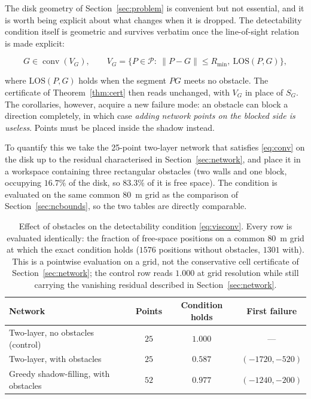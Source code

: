 \documentclass[preprint,12pt,3p]{elsarticle}
\theoremstyle{definition}
\newcommand{\conv}{\operatorname{conv}}
\newcommand{\Rmin}{R_{\min}}
\newcommand{\bP}{\mathcal{P}}
\begin{document}
The disk geometry of Section~\ref{sec:problem} is convenient but not essential, and it is worth
being explicit about what changes when it is dropped. The detectability condition itself is
geometric and survives verbatim once the line-of-sight relation is made explicit:

\begin{equation}
G\in\conv(V_G),\qquad
V_G=\{P\in\bP:\ \|P-G\|\le\Rmin,\ \mathrm{LOS}(P,G)\},
\label{eq:visconv}
\end{equation}

where $\mathrm{LOS}(P,G)$ holds when the segment $PG$ meets no obstacle. The certificate of
Theorem~\ref{thm:cert} then reads unchanged, with $V_G$ in place of $S_G$. The corollaries,
however, acquire a new failure mode: an obstacle can block a direction completely, in which case
\emph{adding network points on the blocked side is useless}. Points must be placed inside the
shadow instead.

To quantify this we take the 25-point two-layer network that satisfies \eqref{eq:conv} on the disk up to the residual characterised in Section~\ref{sec:network}, and place it in a workspace containing three rectangular obstacles (two walls and one
block, occupying $16.7\%$ of the disk, so $83.3\%$ of it is free space). The condition is
evaluated on the same common $80$~m grid as the comparison of Section~\ref{sec:ncbounds}, so the
two tables are directly comparable.

\begin{table}[t]
\caption{Effect of obstacles on the detectability condition \eqref{eq:visconv}. Every row is
evaluated identically: the fraction of free-space positions on a common $80$~m grid at which the
exact condition holds ($1576$ positions without obstacles, $1301$ with). This is a pointwise
evaluation on a grid, not the conservative cell certificate of Section~\ref{sec:network}; the
control row reads $1.000$ at grid resolution while still carrying the vanishing residual
described in Section~\ref{sec:network}.}
\label{tab:obstacles}
\centering
\small
\begin{tabular}{lccc}
\toprule
Network & Points & Condition holds & First failure \\
\midrule
Two-layer, no obstacles (control)   & $25$ & $1.000$ & --- \\
Two-layer, with obstacles           & $25$ & $0.587$ & $(-1720,-520)$ \\
Greedy shadow-filling, with obstacles & $52$ & $0.977$ & $(-1240,-200)$ \\
\bottomrule
\end{tabular}
\end{table}
\end{document}

